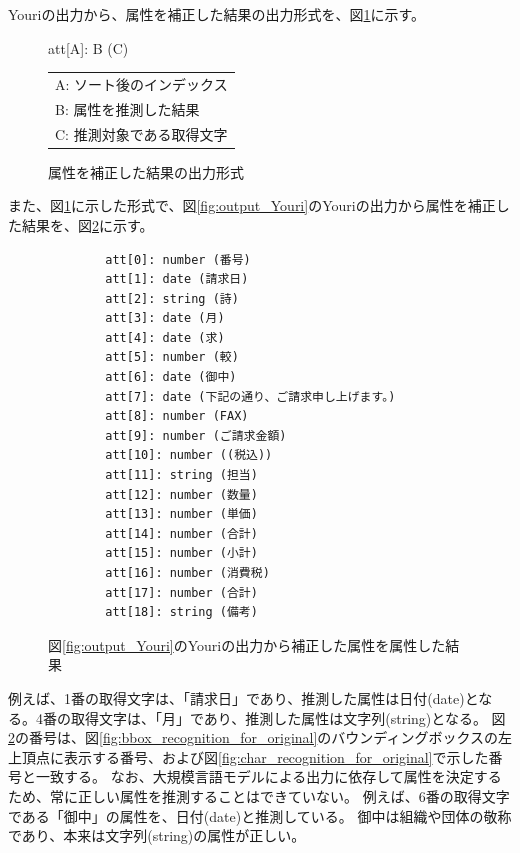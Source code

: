 Youriの出力から、属性を補正した結果の出力形式を、図\ref{fig:format_att}に示す。
\begin{figure}[tp]
    \begin{center}
        att[A]: B (C)
    \end{center}

    \begin{center}
        \begin{tabular}{l}
            A: ソート後のインデックス\\
            B: 属性を推測した結果\\
            C: 推測対象である取得文字\\
        \end{tabular}
    \end{center}
    \caption{属性を補正した結果の出力形式}
    \label{fig:format_att}
\end{figure}
また、図\ref{fig:format_att}に示した形式で、図\ref{fig:output_Youri}のYouriの出力から属性を補正した結果を、図\ref{fig:predict_att_for_original}に示す。
\lstset{language=}
\begin{figure}[tp]
    \begin{lstlisting}
        att[0]: number (番号)
        att[1]: date (請求日)
        att[2]: string (詩)
        att[3]: date (月)
        att[4]: date (求)
        att[5]: number (較)
        att[6]: date (御中)
        att[7]: date (下記の通り、ご請求申し上げます。)
        att[8]: number (FAX)
        att[9]: number (ご請求金額)
        att[10]: number ((税込))
        att[11]: string (担当)
        att[12]: number (数量)
        att[13]: number (単価)
        att[14]: number (合計)
        att[15]: number (小計)
        att[16]: number (消費税)
        att[17]: number (合計)
        att[18]: string (備考)
    \end{lstlisting}
    \caption{図\ref{fig:output_Youri}のYouriの出力から補正した属性を属性した結果}
    \label{fig:predict_att_for_original}
\end{figure}
例えば、1番の取得文字は、「請求日」であり、推測した属性は日付(date)となる。4番の取得文字は、「月」であり、推測した属性は文字列(string)となる。
図\ref{fig:predict_att_for_original}の番号は、図\ref{fig:bbox_recognition_for_original}のバウンディングボックスの左上頂点に表示する番号、および図\ref{fig:char_recognition_for_original}で示した番号と一致する。
なお、大規模言語モデルによる出力に依存して属性を決定するため、常に正しい属性を推測することはできていない。
例えば、6番の取得文字である「御中」の属性を、日付(date)と推測している。
御中は組織や団体の敬称であり、本来は文字列(string)の属性が正しい。

